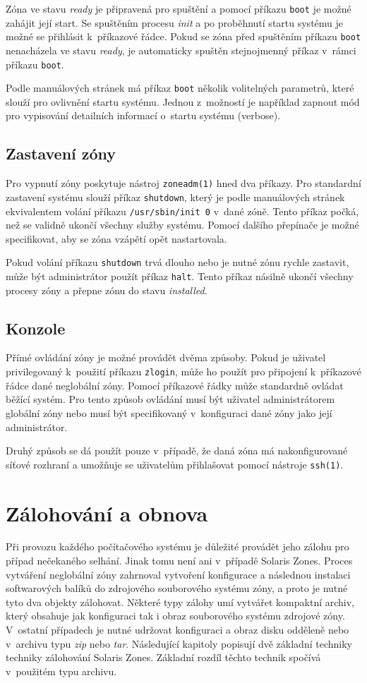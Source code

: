 Zóna ve stavu \textit{ready} je připravená pro spuštění a pomocí příkazu \verb|boot| je možné zahájit její start. Se spuštěním
procesu \textit{init} a po proběhnutí startu systému je možné se přihlásit k~příkazové řádce. Pokud se zóna před spuštěním příkazu
\verb|boot| nenacházela ve stavu \textit{ready}, je automaticky spuštěn stejnojmenný příkaz v~rámci příkazu \verb|boot|.

Podle manuálových stránek \cite{oracle:manpages:zoneadm} má příkaz \verb|boot| několik volitelných parametrů, které slouží
pro ovlivnění startu systému. Jednou z~možností je například zapnout mód pro vypisování detailních informací o~startu systému
(verbose).
\subsection{Zastavení zóny}
\label{chapter:zones:management:stop}
Pro vypnutí zóny poskytuje nástroj \verb|zoneadm(1)| hned dva příkazy. Pro standardní zastavení systému slouží příkaz \verb|shutdown|,
který je podle manuálových stránek \cite{oracle:manpages:zoneadm} ekvivalentem volání příkazu \verb|/usr/sbin/init 0| v~dané zóně.
Tento příkaz počká, než se validně ukončí všechny služby systému. Pomocí dalšího přepínače je možné specifikovat, aby
se zóna vzápětí opět nastartovala.

Pokud volání příkazu \verb|shutdown| trvá dlouho nebo je nutné zónu rychle zastavit, může být administrátor použít příkaz \verb|halt|.
Tento příkaz násilně ukončí všechny procesy zóny a přepne zónu do stavu \textit{installed}.
\subsection{Konzole}
\label{chapter:zones:management:console}
Přímé ovládání zóny je možné provádět dvěma způsoby. Pokud je uživatel privilegovaný k~použití příkazu \verb|zlogin|, může ho
použít pro připojení k~příkazové řádce dané neglobální zóny. Pomocí příkazové řádky může standardně ovládat běžící systém. Pro tento
způsob ovládání musí být uživatel administrátorem globální zóny nebo musí být specifikovaný v~konfiguraci dané zóny jako její
administrátor.

Druhý způsob se dá použít pouze v~případě, že daná zóna má nakonfigurované síťové rozhraní a umožňuje se uživatelům přihlašovat
pomocí nástroje \verb|ssh(1)|.
\section{Zálohování a obnova}
\label{chapter:zones:backup}
Při provozu každého počítačového systému je důležité provádět jeho zálohu pro případ nečekaného selhání. Jinak tomu není ani
v~případě Solaris Zones. Proces vytváření neglobální zóny zahrnoval vytvoření konfigurace a následnou instalaci softwarových
balíků do zdrojového souborového systému zóny, a proto je nutné tyto dva objekty zálohovat. Některé typy zálohy umí vytvářet
kompaktní archiv, který obsahuje jak konfiguraci tak i obraz souborového systému zdrojové zóny. V~ostatní případech je nutné
udržovat konfiguraci a obraz disku odděleně nebo v~archivu typu \textit{zip} nebo \textit{tar}. Následující kapitoly popisují
dvě základní techniky techniky zálohování Solaris Zones. Základní rozdíl těchto technik spočívá v~použitém typu archivu.

